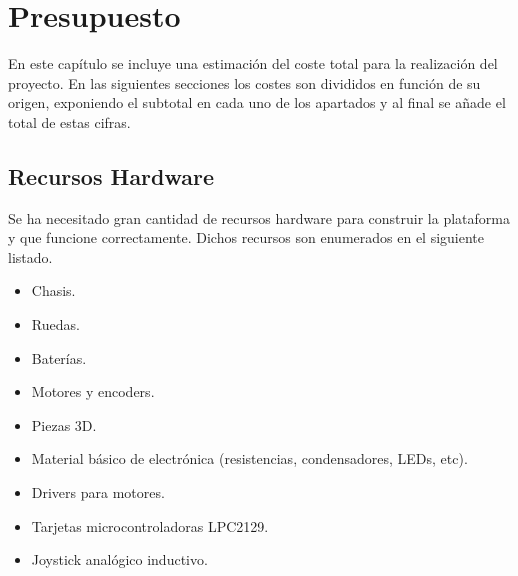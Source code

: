 %
%
%
% 
%
%
%
%

\chapter{Presupuesto}
\label{cha:presupuesto}


En este capítulo se incluye una estimación del coste total para la realización del proyecto. En las siguientes secciones los costes son divididos en función de su origen, exponiendo el subtotal en cada uno de los apartados y al final se añade el total de estas cifras.

\section{Recursos Hardware}
\label{sec:presupuesto-hardware}

Se ha necesitado gran cantidad de recursos hardware para construir la plataforma y que funcione correctamente. Dichos recursos son enumerados en el siguiente listado.

\begin{itemize}
    \item Chasis.
    \item Ruedas.
    \item Baterías.
    \item Motores y encoders.
    \item Piezas 3D.
    \item Material básico de electrónica (resistencias, condensadores, LEDs, etc).
    \item Drivers para motores.
    \item Tarjetas microcontroladoras LPC2129.
    \item Joystick analógico inductivo.
\end{itemize}

